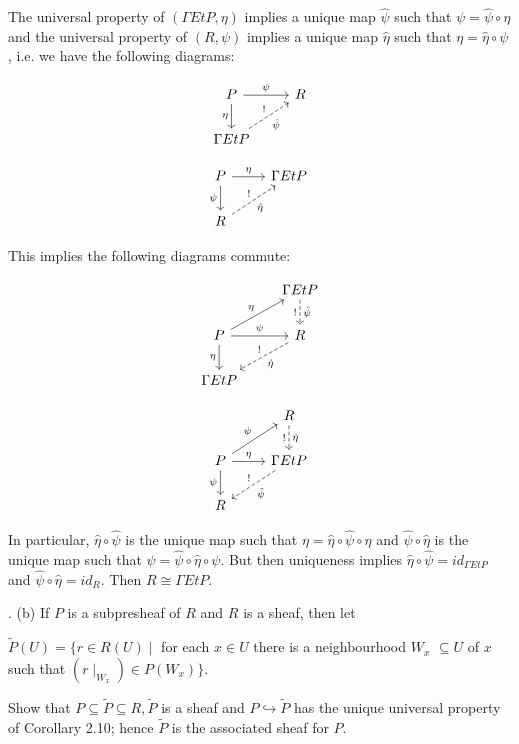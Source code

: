 The universal property of $(\Gamma EtP, \eta)$ implies a unique map $\hat{\psi}$ such that $\psi = \hat{\psi} \circ \eta $ and the universal property of $(R, \psi)$ implies a unique map $\hat{\eta}$ such that $\eta=\hat{\eta} \circ \psi$, i.e. we have the following diagrams: 
\begin{multicols}{2}

\[
\begin{tikzcd}
P \arrow[r,"\psi"] \arrow[d, "\eta"']
& R \\
\Gamma EtP \arrow[ru, "!", "\hat{\psi}"', dashed]
\end{tikzcd}
\]

\[
\begin{tikzcd}
P \arrow[r,"\eta"] \arrow[d, "\psi"']
& \Gamma EtP \\
R \arrow[ru, "!", "\hat{\eta}"', dashed]
\end{tikzcd}
\]
\end{multicols}

This implies the following diagrams commute:
\begin{multicols}{2}
\[
\begin{tikzcd}
& \Gamma EtP \arrow[d, "!"', "\hat{\psi}", dashed]\\
P \arrow[r,"\psi"] \arrow[d, "\eta"'] \arrow[ru, "\eta"]
& R \arrow[ld, "!"',"\hat{\eta}", dashed]\\
\Gamma EtP 
\end{tikzcd}
\]

\[
\begin{tikzcd}
& R \arrow[d, "!"', "\hat{\eta}", dashed]\\
P \arrow[r,"\eta"] \arrow[d, "\psi"'] \arrow[ru, "\psi"]
& \Gamma EtP \arrow[ld, "!"', "\hat{\psi}", dashed]\\
R 
\end{tikzcd}
\]
\end{multicols}

In particular, $\hat{\eta} \circ \hat{\psi}$ is the unique map such that $\eta = \hat{\eta} \circ \hat{\psi} \circ \eta$ and $\hat{\psi} \circ \hat{\eta}$ is the unique map such that $\psi = \hat{\psi} \circ \hat{\eta} \circ \psi$. But then uniqueness implies $\hat{\eta} \circ \hat{\psi} = id_{\Gamma Et P}$ and $\hat{\psi} \circ \hat{\eta} = id_R$. Then $R \cong \Gamma Et P$.



\newpage
{}. (b) If $P$ is a subpresheaf of $R$ and $R$ is a sheaf, then let
\begin{center}
$ \tilde{P}(U) = \{r \in R(U) \mid$ for each $x \in U$ there is a neighbourhood $W_x$ $\subseteq U$ of $x$ such that $(r\mid_{W_x}) \in P(W_x)\}$.\\
\end{center}
\noindent Show that $ P\subseteq \tilde{P} \subseteq R, \tilde{P}$ is a sheaf and $P \hookrightarrow \tilde{P}$ has the unique universal property of Corollary 2.10; hence $\tilde{P}$ is the associated sheaf for $P$.\\

